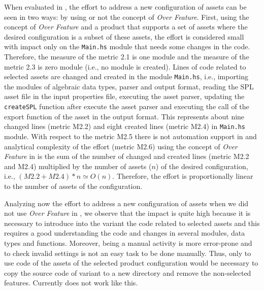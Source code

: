 When evaluated in \hp{}, the effort to address a new configuration of assets can be seen in two ways: by using or not the concept of \textit{Over Feature}. 
First, using the concept of \textit{Over Feature} and a \hp{} product that supports a set of assets where the desired configuration is a subset of these assets, the effort is considered small with impact only on the \texttt{Main.hs} module that needs some changes in
the code. Therefore, the measure of the metric 2.1 is one module and the measure of the metric 2.3 is zero module (i.e., no module is created). Lines of code related to selected assets are changed and created in the module \texttt{Main.hs}, i.e., importing the modules of algebraic data types, parser and output format, reading the SPL asset file in the input \hp{} properties file, executing the asset parser, updating the \texttt{createSPL} function after execute the asset parser
and executing the call of the export function of the asset in the output format. This represents about nine changed lines (metric M2.2) and eight created lines (metric M2.4) in \texttt{Main.hs} module. 
With respect to the metric M2.5 there is not automation support in \hp{} and analytical complexity of the effort (metric M2.6) using the concept of \textit{Over Feature} in \hp{} is the sum of the number of changed and created lines (metric M2.2 and M2.4) multiplied by the number of assets ($n$) of the desired configuration, i.e., $(M2.2 + M2.4) * n \simeq O(n)$. Therefore, the effort is proportionally linear to the number of assets of the configuration.

Analyzing now the effort to address a new configuration of assets when we did not use \textit{Over Feature} in \hp{}, we observe that the impact is quite high because it is necessary to introduce into the \hp{} variant the code related to selected assets and this requires a good understanding the code and changes in several modules, data types and functions. Moreover, being a manual activity is more error-prone and to check invalid settings is not an easy task to be done manually. Thus, only to use code of the assets of the selected product configuration would be necessary to copy the source code of \hp{} variant to a new directory and remove the non-selected features. Currently \hp{} does not work like this.

